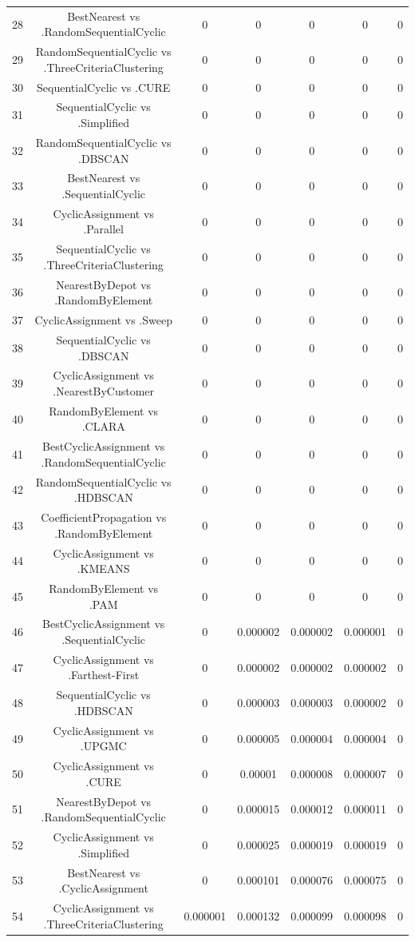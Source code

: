 \documentclass[a4paper,10pt]{article}
\begin{document}
\begin{landscape}
\begin{table}[!htp]
\begin{tabular}{ccccccc}
28&BestNearest vs .RandomSequentialCyclic&0&0&0&0&0\\
29&RandomSequentialCyclic vs .ThreeCriteriaClustering&0&0&0&0&0\\
30&SequentialCyclic vs .CURE&0&0&0&0&0\\
31&SequentialCyclic vs .Simplified&0&0&0&0&0\\
32&RandomSequentialCyclic vs .DBSCAN&0&0&0&0&0\\
33&BestNearest vs .SequentialCyclic&0&0&0&0&0\\
34&CyclicAssignment vs .Parallel&0&0&0&0&0\\
35&SequentialCyclic vs .ThreeCriteriaClustering&0&0&0&0&0\\
36&NearestByDepot vs .RandomByElement&0&0&0&0&0\\
37&CyclicAssignment vs .Sweep&0&0&0&0&0\\
38&SequentialCyclic vs .DBSCAN&0&0&0&0&0\\
39&CyclicAssignment vs .NearestByCustomer&0&0&0&0&0\\
40&RandomByElement vs .CLARA&0&0&0&0&0\\
41&BestCyclicAssignment vs .RandomSequentialCyclic&0&0&0&0&0\\
42&RandomSequentialCyclic vs .HDBSCAN&0&0&0&0&0\\
43&CoefficientPropagation vs .RandomByElement&0&0&0&0&0\\
44&CyclicAssignment vs .KMEANS&0&0&0&0&0\\
45&RandomByElement vs .PAM&0&0&0&0&0\\
46&BestCyclicAssignment vs .SequentialCyclic&0&0.000002&0.000002&0.000001&0\\
47&CyclicAssignment vs .Farthest-First&0&0.000002&0.000002&0.000002&0\\
48&SequentialCyclic vs .HDBSCAN&0&0.000003&0.000003&0.000002&0\\
49&CyclicAssignment vs .UPGMC&0&0.000005&0.000004&0.000004&0\\
50&CyclicAssignment vs .CURE&0&0.00001&0.000008&0.000007&0\\
51&NearestByDepot vs .RandomSequentialCyclic&0&0.000015&0.000012&0.000011&0\\
52&CyclicAssignment vs .Simplified&0&0.000025&0.000019&0.000019&0\\
53&BestNearest vs .CyclicAssignment&0&0.000101&0.000076&0.000075&0\\
54&CyclicAssignment vs .ThreeCriteriaClustering&0.000001&0.000132&0.000099&0.000098&0\\

\end{tabular}
\end{table}
\end{landscape}
\end{document}

